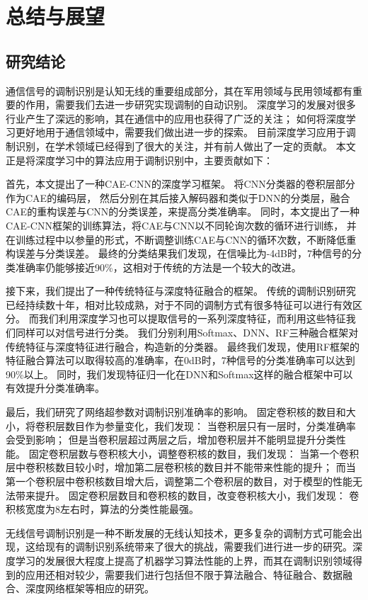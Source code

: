 \chapter{总结与展望}
\section{研究结论}
通信信号的调制识别是认知无线的重要组成部分，其在军用领域与民用领域都有重要的作用，需要我们去进一步研究实现调制的自动识别。
深度学习的发展对很多行业产生了深远的影响，其在通信中的应用也获得了广泛的关注；
如何将深度学习更好地用于通信领域中，需要我们做出进一步的探索。
目前深度学习应用于调制识别，在学术领域已经得到了很大的关注，并有前人做出了一定的贡献。
本文正是将深度学习中的算法应用于调制识别中，主要贡献如下：

首先，本文提出了一种CAE-CNN的深度学习框架。
将CNN分类器的卷积层部分作为CAE的编码层，
然后分别在其后接入解码器和类似于DNN的分类层，融合CAE的重构误差与CNN的分类误差，来提高分类准确率。
同时，本文提出了一种CAE-CNN框架的训练算法，将CAE与CNN以不同轮询次数的循环进行训练，
并在训练过程中以参量的形式，不断调整训练CAE与CNN的循环次数，不断降低重构误差与分类误差。
最终的分类结果我们发现，在信噪比为-4dB时，7种信号的分类准确率仍能够接近90\%，这相对于传统的方法是一个较大的改进。\par

接下来，我们提出了一种传统特征与深度特征融合的框架。
传统的调制识别研究已经持续数十年，相对比较成熟，对于不同的调制方式有很多特征可以进行有效区分。
而我们利用深度学习也可以提取信号的一系列深度特征，而利用这些特征我们同样可以对信号进行分类。
我们分别利用Softmax、DNN、RF三种融合框架对传统特征与深度特征进行融合，构造新的分类器。
最终我们发现，使用RF框架的特征融合算法可以取得较高的准确率，在0dB时，7种信号的分类准确率可以达到90\%以上。
同时，我们发现特征归一化在DNN和Softmax这样的融合框架中可以有效提升分类准确率。\par

最后，我们研究了网络超参数对调制识别准确率的影响。
固定卷积核的数目和大小，将卷积层数目作为参量变化，我们发现：
当卷积层只有一层时，分类准确率会受到影响；
但是当卷积层超过两层之后，增加卷积层并不能明显提升分类性能。
固定卷积层数与卷积核大小，调整卷积核的数目，我们发现：
当第一个卷积层中卷积核数目较小时，增加第二层卷积核的数目并不能带来性能的提升；
而当第一个卷积层中卷积核数目增大后，调整第二个卷积层的数目，对于模型的性能无法带来提升。
固定卷积层数目和卷积核的数目，改变卷积核大小，我们发现：
卷积核宽度为8左右时，算法的分类性能最强。

无线信号调制识别是一种不断发展的无线认知技术，更多复杂的调制方式可能会出现，这给现有的调制识别系统带来了很大的挑战，需要我们进行进一步的研究。深度学习的发展很大程度上提高了机器学习算法性能的上界，而其在调制识别领域得到的应用还相对较少，需要我们进行包括但不限于算法融合、特征融合、数据融合、深度网络框架等相应的研究。

